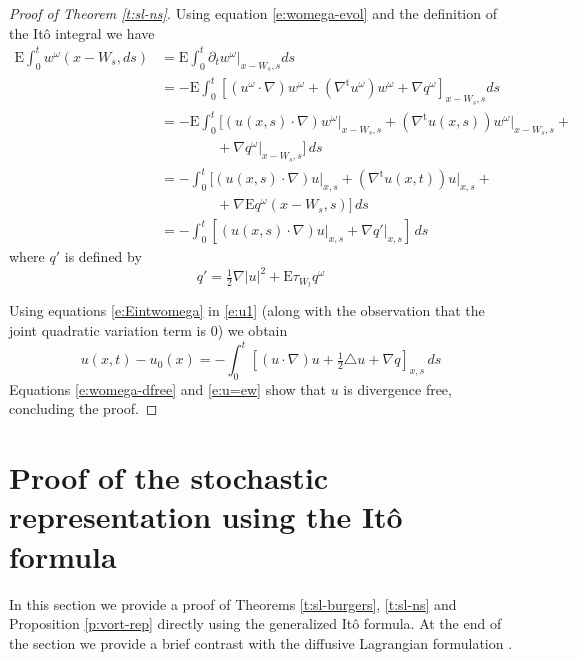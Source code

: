 \documentclass[final]{amsart}%
\newcommand{\del}{\partial}
\newcommand{\lap}{\triangle}
\newcommand{\transpose}{^\text{t}}
\newcommand{\grad}{\nabla}
\newcommand{\gradt}{\grad\transpose}
\newcommand{\womega}{{w^\omega}}
\newcommand{\E}{\boldsymbol{\mathrm{E}}}
\newcommand{\at}[1]{\big|_{#1}}
\numberwithin{equation}{section}
\theoremstyle{definition}
\theoremstyle{remark}
\begin{document}
\begin{proof}[Proof of Theorem \ref{t:sl-ns}]
Using equation \eqref{e:womega-evol} and the definition of the It\^o integral we have
\begin{align}
\nonumber \E \int_0^t \womega( x - W_s, ds) &= \E \int_0^t \del_t \womega\at{x-W_s, s} ds\\
\nonumber     & = - \E \int_0^t \left[ ( u^\omega \cdot \grad ) \womega + (\gradt u^\omega) \womega + \grad q^\omega \right]_{x-W_s, s} ds\\
\nonumber     & = - \E \int_0^t \Big[ \left( u(x,s) \cdot \grad \right) \womega\at{x-W_s, s} + \left(\gradt u(x,s)\right) \womega\at{x-W_s, s} +\\
\nonumber     &\qquad\qquad + \grad q^\omega\at{x-W_s, s}\Big]\, ds\\
\nonumber     & = - \int_0^t \Big[ \left( u(x,s) \cdot \grad \right) u\at{x, s} + \left(\gradt u(x,t)\right) u\at{x, s} + \\
\nonumber     & \qquad\qquad + \grad \E q^\omega(x - W_s, s) \Big] \, ds\\
\label{e:Eintwomega}     & = - \int_0^t \left[ \left( u(x,s) \cdot \grad \right) u\at{x, s} + \grad q'\at{x,s} \right]\,ds
\end{align}
where $q'$ is defined by
\begin{equation*}
q' = \tfrac{1}{2} \grad |u|^2 + \E \tau_{W_t} q^\omega
\end{equation*}

Using equations \eqref{e:Eintwomega} in \eqref{e:u1} (along with the observation that the joint quadratic variation term is $0$) we obtain
\begin{equation*}
u(x,t) - u_0(x) = - \int_0^t \left[ (u \cdot \grad) u + \tfrac{1}{2} \lap u + \grad q \right]_{x,s} \, ds
\end{equation*}
Equations \eqref{e:womega-dfree} and \eqref{e:u=ew} show that $u$ is divergence free, concluding the proof.
\end{proof}

\section{Proof of the stochastic representation using the It\^o formula}\label{s:ito-proof}%

In this section we provide a proof of Theorems \ref{t:sl-burgers}, \ref{t:sl-ns} and Proposition \ref{p:vort-rep} directly using the generalized It\^o formula. At the end of the section we provide a brief contrast with the diffusive Lagrangian formulation \cite{elns}.\smallskip
\end{document}

